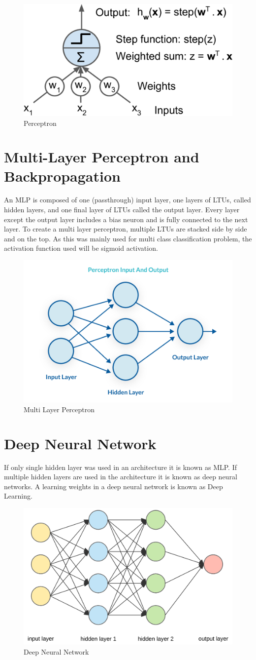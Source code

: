     \begin{figure}[h]
        \centering
        \includegraphics[width=0.5\linewidth]{perceptron.png}
        \caption{Perceptron}
        \label{fig:perceptron}
    \end{figure} 
\section{Multi-Layer Perceptron and Backpropagation}
    An MLP is composed of one (passthrough) input layer, one layers of LTUs, called hidden layers, and one final layer of LTUs called the output layer. Every layer except the output layer includes a bias neuron and is fully connected to the next layer.  To create a multi layer perceptron, multiple LTUs are stacked side by side and on the top. As this was mainly used for multi class classification problem, the activation function used will be sigmoid activation.
    \begin{figure}[h]
        \centering
        \includegraphics[width=0.5\linewidth]{mlp.png}
        \caption{Multi Layer Perceptron}
        \label{fig:perceptron}
    \end{figure} 
\section{Deep Neural Network}
    If only single hidden layer was used in an architecture it is known as MLP.  If multiple hidden layers are used in the architecture it is known as deep neural networks. A learning weights in a deep neural network is known as Deep Learning.
    \begin{figure}[h]
        \centering
        \includegraphics[width=0.5\linewidth]{dnn.png}
        \caption{Deep Neural Network}
        \label{fig:perceptron}
    \end{figure} 
